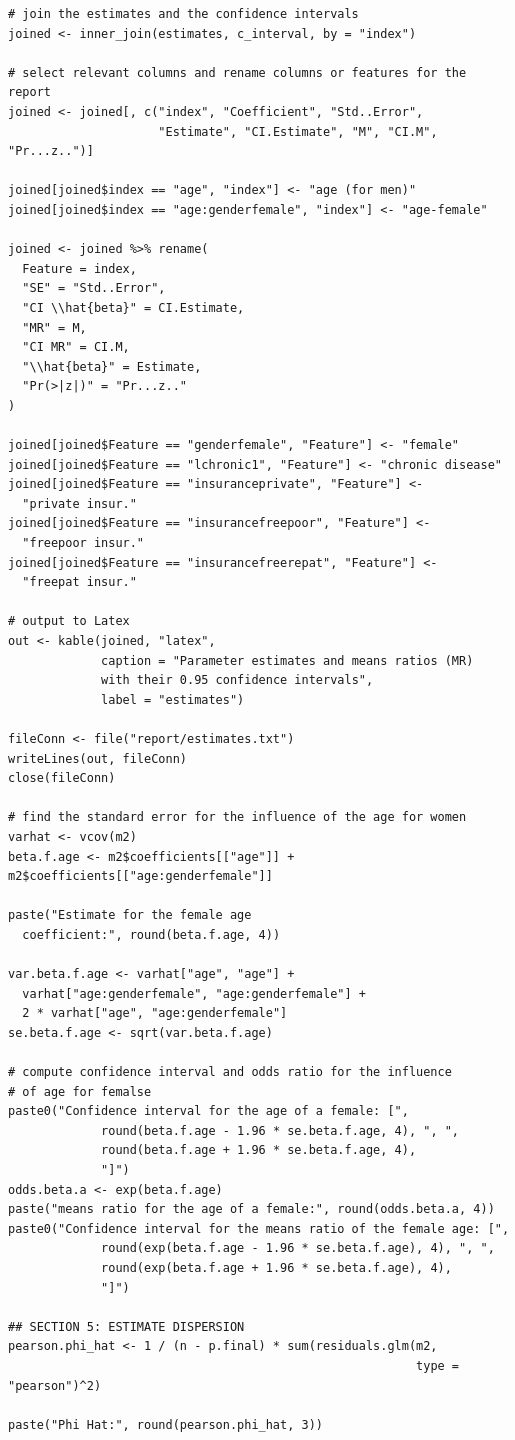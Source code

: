 \documentclass[a4paper,11pt]{article}
\begin{document}
\begin{verbatim}
# join the estimates and the confidence intervals
joined <- inner_join(estimates, c_interval, by = "index")

# select relevant columns and rename columns or features for the report
joined <- joined[, c("index", "Coefficient", "Std..Error",
                     "Estimate", "CI.Estimate", "M", "CI.M", "Pr...z..")]

joined[joined$index == "age", "index"] <- "age (for men)"
joined[joined$index == "age:genderfemale", "index"] <- "age-female"

joined <- joined %>% rename(
  Feature = index,
  "SE" = "Std..Error",
  "CI \\hat{beta}" = CI.Estimate,
  "MR" = M,
  "CI MR" = CI.M,
  "\\hat{beta}" = Estimate,
  "Pr(>|z|)" = "Pr...z.."
)

joined[joined$Feature == "genderfemale", "Feature"] <- "female"
joined[joined$Feature == "lchronic1", "Feature"] <- "chronic disease"
joined[joined$Feature == "insuranceprivate", "Feature"] <-
  "private insur."
joined[joined$Feature == "insurancefreepoor", "Feature"] <-
  "freepoor insur."
joined[joined$Feature == "insurancefreerepat", "Feature"] <-
  "freepat insur."

# output to Latex
out <- kable(joined, "latex",
             caption = "Parameter estimates and means ratios (MR)
             with their 0.95 confidence intervals",
             label = "estimates")

fileConn <- file("report/estimates.txt")
writeLines(out, fileConn)
close(fileConn)

# find the standard error for the influence of the age for women
varhat <- vcov(m2)
beta.f.age <- m2$coefficients[["age"]] + m2$coefficients[["age:genderfemale"]]

paste("Estimate for the female age
  coefficient:", round(beta.f.age, 4))

var.beta.f.age <- varhat["age", "age"] +
  varhat["age:genderfemale", "age:genderfemale"] +
  2 * varhat["age", "age:genderfemale"]
se.beta.f.age <- sqrt(var.beta.f.age)

# compute confidence interval and odds ratio for the influence
# of age for femalse
paste0("Confidence interval for the age of a female: [",
             round(beta.f.age - 1.96 * se.beta.f.age, 4), ", ",
             round(beta.f.age + 1.96 * se.beta.f.age, 4),
             "]")
odds.beta.a <- exp(beta.f.age)
paste("means ratio for the age of a female:", round(odds.beta.a, 4))
paste0("Confidence interval for the means ratio of the female age: [",
             round(exp(beta.f.age - 1.96 * se.beta.f.age), 4), ", ",
             round(exp(beta.f.age + 1.96 * se.beta.f.age), 4),
             "]")

## SECTION 5: ESTIMATE DISPERSION
pearson.phi_hat <- 1 / (n - p.final) * sum(residuals.glm(m2,
                                                         type = "pearson")^2)

paste("Phi Hat:", round(pearson.phi_hat, 3))

\end{verbatim}
\end{document}
